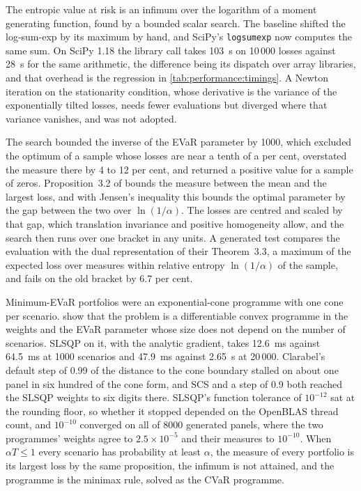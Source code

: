 The entropic value at risk \citep{ahmadijavid_entropic_2012} is an infimum
over the logarithm of a moment generating function, found by a bounded scalar
search. The baseline shifted the log-sum-exp by its maximum by hand, and
SciPy's \texttt{logsumexp} now computes the same sum. On SciPy 1.18 the library
call takes 103~\textmu s on 10\,000 losses against 28~\textmu s for the same
arithmetic, the difference being its dispatch over array libraries, and that
overhead is the regression in \cref{tab:performance:timings}. A Newton
iteration on the stationarity condition, whose derivative is the variance of
the exponentially tilted losses, needs fewer evaluations but diverged where
that variance vanishes, and was not adopted.

The search bounded the inverse of the EVaR parameter by 1000, which excluded
the optimum of a sample whose losses are near a tenth of a per cent,
overstated the measure there by 4 to 12 per cent, and returned a positive
value for a sample of zeros. Proposition~3.2 of
\citet{ahmadijavid_entropic_2012} bounds the measure between the mean and the
largest loss, and with Jensen's inequality this bounds the optimal parameter
by the gap between the two over $\ln(1/\alpha)$. The losses are centred and
scaled by that gap, which translation invariance and positive homogeneity
allow, and the search then runs over one bracket in any units. A generated
test compares the evaluation with the dual representation of their
Theorem~3.3, a maximum of the expected loss over measures within relative
entropy $\ln(1/\alpha)$ of the sample, and fails on the old bracket by
6.7 per cent.

Minimum-EVaR portfolios were an exponential-cone programme with one cone per
scenario. \citet{ahmadijavid_portfolio_2019} show that the problem is a
differentiable convex programme in the weights and the EVaR parameter whose
size does not depend on the number of scenarios. SLSQP on it, with the
analytic gradient, takes 12.6~ms against 64.5~ms at 1000 scenarios and
47.9~ms against 2.65~s at 20\,000. Clarabel's default step of 0.99 of the
distance to the cone boundary stalled on about one panel in six hundred of
the cone form, and SCS and a step of 0.9 both reached the SLSQP weights to six
digits there. SLSQP's function tolerance of $10^{-12}$ sat at the rounding
floor, so whether it stopped depended on the OpenBLAS thread count, and
$10^{-10}$ converged on all of 8000 generated panels, where the two
programmes' weights agree to $2.5 \times 10^{-5}$ and their measures to
$10^{-10}$. When $\alpha T \le 1$ every scenario has probability at least
$\alpha$, the measure of every portfolio is its largest loss by the same
proposition, the infimum is not attained, and the programme is the minimax
rule, solved as the CVaR programme.

